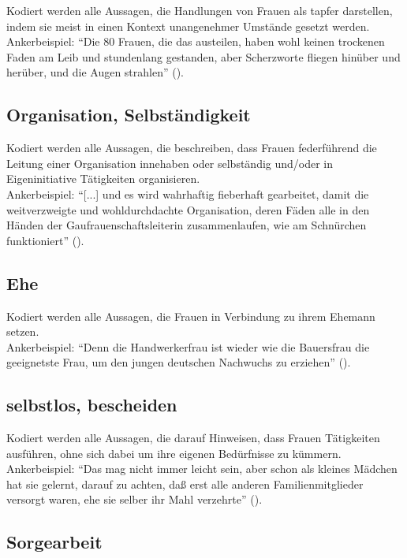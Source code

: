 \documentclass[12pt, titlepage=true, toc=bib]{scrartcl}
\begin{document}
Kodiert werden alle Aussagen, die Handlungen von Frauen als tapfer darstellen, indem sie meist in einen Kontext unangenehmer Umstände gesetzt werden.\\
Ankerbeispiel: "`Die 80 Frauen, die das austeilen, haben wohl keinen trockenen Faden am Leib und stundenlang gestanden, aber Scherzworte fliegen hinüber und herüber, und die Augen strahlen"' (\cite[775]{a._v._s._kameradschaft_1936}).

\subsection*{Organisation, Selbständigkeit}

Kodiert werden alle Aussagen, die beschreiben, dass Frauen federführend die Leitung einer Organisation innehaben oder selbständig und/oder in Eigeninitiative Tätigkeiten organisieren.\\
Ankerbeispiel: "`[...] und es wird wahrhaftig fieberhaft gearbeitet, damit die weitverzweigte und wohldurchdachte Organisation, deren Fäden alle in den Händen der Gaufrauenschaftsleiterin zusammenlaufen, wie am Schnürchen funktioniert"' (\cite[778]{a._v._s._kameradschaft_1936}).

\subsection*{Ehe}

Kodiert werden alle Aussagen, die Frauen in Verbindung zu ihrem Ehemann setzen.\\
Ankerbeispiel: "`Denn die Handwerkerfrau ist wieder wie die Bauersfrau die geeignetste Frau, um den jungen deutschen Nachwuchs zu erziehen"' (\cite[836]{scholtz-klink_frauen_1936}).

\subsection*{selbstlos, bescheiden}

Kodiert werden alle Aussagen, die darauf Hinweisen, dass Frauen Tätigkeiten ausführen, ohne sich dabei um ihre eigenen Bedürfnisse zu kümmern.\\
Ankerbeispiel: "`Das mag nicht immer leicht sein, aber schon als kleines Mädchen hat sie gelernt, darauf zu achten, daß erst alle anderen Familienmitglieder versorgt waren, ehe sie selber ihr Mahl verzehrte"' (\cite[5]{friewart_japanisches_1941}).

\subsection*{Sorgearbeit}
\end{document}
